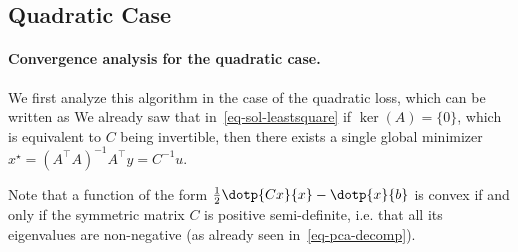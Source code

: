 \subsection{Quadratic Case}

\paragraph{Convergence analysis for the quadratic case.}

We first analyze this algorithm in the case of the quadratic loss, which can be written as
We already saw that in~\eqref{eq-sol-leastsquare} if $\ker(A)=\{0\}$, which is equivalent to $C$ being invertible, then there exists a single global minimizer $x^\star = (A^\top A)^{-1} A^\top y = C^{-1} u$. 

Note that a function of the form $\frac{1}{2} \dotp{Cx}{x} - \dotp{x}{b}$ is convex if and only if the symmetric matrix $C$ is positive semi-definite, i.e. that all its eigenvalues are non-negative (as already seen in~\eqref{eq-pca-decomp}).

